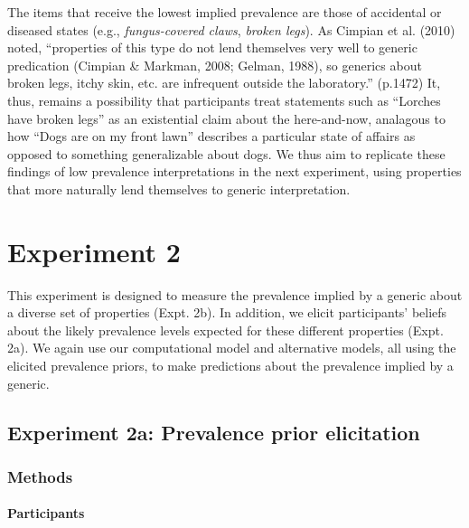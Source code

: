 \documentclass[floatsintext,doc]{apa6}
\theoremstyle{definition}
\theoremstyle{definition}
\theoremstyle{definition}
\theoremstyle{remark}
\begin{document}

The items that receive the lowest implied prevalence are those of
accidental or diseased states (e.g., \emph{fungus-covered claws},
\emph{broken legs}). As Cimpian et al. (2010) noted, \enquote{properties
of this type do not lend themselves very well to generic predication
(Cimpian \& Markman, 2008; Gelman, 1988), so generics about broken legs,
itchy skin, etc. are infrequent outside the laboratory.} (p.1472) It,
thus, remains a possibility that participants treat statements such as
\enquote{Lorches have broken legs} as an existential claim about the
here-and-now, analagous to how \enquote{Dogs are on my front lawn}
describes a particular state of affairs as opposed to something
generalizable about dogs. We thus aim to replicate these findings of low
prevalence interpretations in the next experiment, using properties that more naturally lend
themselves to generic interpretation.

\section{Experiment 2}\label{experiment-2}

This experiment is designed to measure the prevalence implied by a
generic about a diverse set of properties (Expt. 2b). In addition, we
elicit participants' beliefs about the likely prevalence levels expected
for these different properties (Expt. 2a). We again use our computational
model and alternative models, all using the elicited prevalence
priors, to make predictions about the prevalence implied by a generic.

\subsection{Experiment 2a: Prevalence prior
elicitation}\label{experiment-2a-prevalence-prior-elicitation}

\subsubsection{Methods}\label{methods}

\paragraph{Participants}\label{participants-2}
\end{document}
